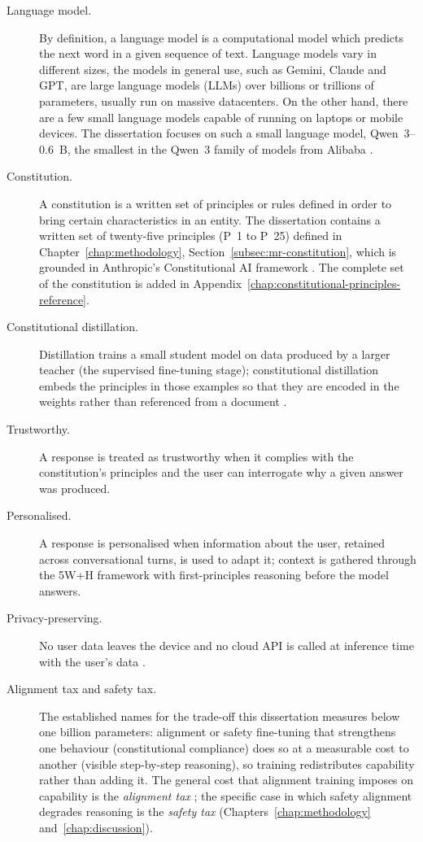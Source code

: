 \begin{description}
  \item[Language model.] By definition, a language model is a computational model which predicts the next word in a given sequence of text. Language models vary in different sizes, the models in general use, such as Gemini, Claude and GPT, are large language models (LLMs) over billions or trillions of parameters, usually run on massive datacenters. On the other hand, there are a few small language models capable of running on laptops or mobile devices. The dissertation focuses on such a small language model, Qwen~3--0.6~B, the smallest in the Qwen~3 family of models from Alibaba \cite{yang2025qwen3technicalreport}.
  \item[Constitution.] A constitution is a written set of principles or rules defined in order to bring certain characteristics in an entity. The dissertation contains a written set of twenty-five principles (P~1 to P~25) defined in Chapter~\ref{chap:methodology}, Section~\ref{subsec:mr-constitution}, which is grounded in Anthropic's Constitutional AI framework \cite{bai2022constitutionalaiharmlessnessai}. The complete set of the constitution is added in Appendix~\ref{chap:constitutional-principles-reference}.
  \item[Constitutional distillation.] Distillation trains a small student model on data produced by a larger teacher (the supervised fine-tuning stage); constitutional distillation embeds the principles in those examples so that they are encoded in the weights rather than referenced from a document \cite{bai2022constitutionalaiharmlessnessai}.
  \item[Trustworthy.] A response is treated as trustworthy when it complies with the constitution's principles and the user can interrogate why a given answer was produced.
  \item[Personalised.] A response is personalised when information about the user, retained across conversational turns, is used to adapt it; context is gathered through the 5W+H framework with first-principles reasoning before the model answers.
  \item[Privacy-preserving.] No user data leaves the device and no cloud API is called at inference time with the user's data \cite{euhleg2019}.
  \item[Alignment tax and safety tax.] The established names for the trade-off this dissertation measures below one billion parameters: alignment or safety fine-tuning that strengthens one behaviour (constitutional compliance) does so at a measurable cost to another (visible step-by-step reasoning), so training redistributes capability rather than adding it. The general cost that alignment training imposes on capability is the \emph{alignment tax} \cite{askell2021generallanguageassistantlaboratory, ouyang2022traininglanguagemodelsfollow}; the specific case in which safety alignment degrades reasoning is the \emph{safety tax} \cite{huang2025safetytaxsafetyalignment, fu2026reducingsafetytaxllm} (Chapters~\ref{chap:methodology} and~\ref{chap:discussion}).

\end{description}

